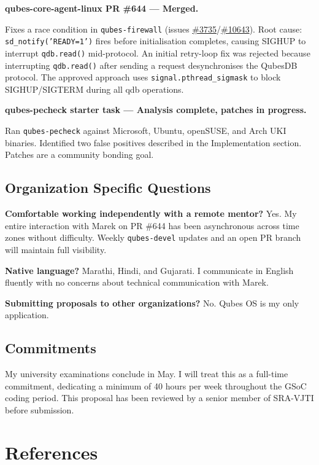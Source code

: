 \documentclass[12pt, a4paper]{article}
\begin{document}
\textbf{qubes-core-agent-linux PR \#644 --- Merged.}

Fixes a race condition in \texttt{qubes-firewall} (issues \href{https://github.com/QubesOS/qubes-issues/issues/3735}{\#3735}/\href{https://github.com/QubesOS/qubes-issues/issues/10643}{\#10643}). Root cause: \texttt{sd\_notify('READY=1')} fires before initialisation completes, causing SIGHUP to interrupt \texttt{qdb.read()} mid-protocol. An initial retry-loop fix was rejected because interrupting \texttt{qdb.read()} after sending a request desynchronises the QubesDB protocol. The approved approach uses \texttt{signal.pthread\_sigmask} to block SIGHUP/SIGTERM during all qdb operations.

\textbf{qubes-pecheck starter task --- Analysis complete, patches in progress.}

Ran \texttt{qubes-pecheck} against Microsoft, Ubuntu, openSUSE, and Arch UKI binaries. Identified two false positives described in the Implementation section. Patches are a community bonding goal.

\subsection*{Organization Specific Questions}

\textbf{Comfortable working independently with a remote mentor?} Yes. My entire interaction with Marek on PR \#644 has been asynchronous across time zones without difficulty. Weekly \texttt{qubes-devel} updates and an open PR branch will maintain full visibility.

\textbf{Native language?} Marathi, Hindi, and Gujarati. I communicate in English fluently with no concerns about technical communication with Marek.

\textbf{Submitting proposals to other organizations?} No. Qubes OS is my only application.

\subsection*{Commitments}
My university examinations conclude in May. I will treat this as a full-time commitment, dedicating a minimum of 40 hours per week throughout the GSoC coding period. This proposal has been reviewed by a senior member of SRA-VJTI before submission.

\section{References}
\end{document}

